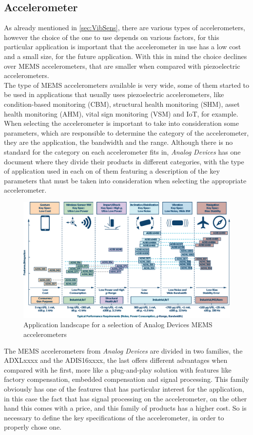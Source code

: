 \subsection{Accelerometer}
As already mentioned in \ref{sec:VibSens}, there are various types of accelerometers, however the choice of the one to use depends on various factors, for this particular application is important that the accelerometer in use has a low cost and a small size, for the future application. With this in mind the choice declines over MEMS accelerometers, that are smaller when compared with piezoelectric accelerometers.\\
The type of MEMS accelerometers available is very wide, some of them started to be used in applications that usually uses piezoelectric accelerometers, like condition-based monitoring (CBM), structural health monitoring (SHM), asset health monitoring (AHM), vital sign monitoring (VSM) and IoT, for example. When selecting the accelerometer is important to take into consideration some parameters, which are responsible to determine the category of the accelerometer, they are the application, the bandwidth and the range. Although there is no standard for the category on each accelerometer fits in, \textit{Analog Devices} has one document where they divide their products in different categories, with the type of application used in each on of them featuring a description of the key parameters that must be taken into consideration when selecting the appropriate accelerometer.
\begin{figure}[!htb]
    \centering
    \includegraphics[width=1\textwidth]{Chapters/3CHP/Images/adTable.pdf}
    \caption{Application landscape for a selection of Analog Devices MEMS accelerometers}
    \label{fig:adtable}
\end{figure}
The MEMS accelerometers from \textit{Analog Devices} are divided in two families, the ADXLxxxx and the ADIS16xxxx, the last offers different advantages when compared with he first, more like a plug-and-play solution with features like factory compensation, embedded compensation and signal processing. This family obviously has one of the features that has particular interest for the application, in this case the fact that has signal processing on the accelerometer, on the other hand this comes with a price, and this family of products has a higher cost. So is necessary to define the key specifications of the accelerometer, in order to properly chose one\cite{AnalogDialogue51102017}\cite{AnalogDialogue51112017}.\\
